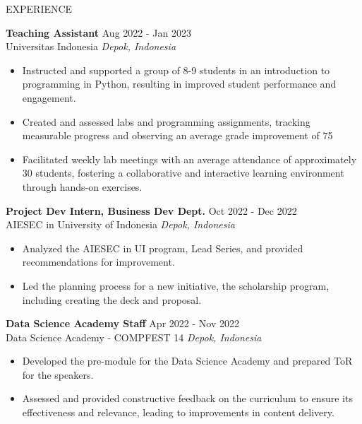 \documentclass{resume} %
\begin{document}
\begin{rSection}{EXPERIENCE}

\textbf{Teaching Assistant} \hfill Aug 2022 - Jan 2023 \\
Universitas Indonesia \hfill \textit{Depok, Indonesia}
\vspace{-0.75em}
\begin{itemize}
\itemsep -7pt {}
\item Instructed and supported a group of 8-9 students in an introduction to programming in Python, resulting in improved student performance and engagement.
\item Created and assessed labs and programming assignments, tracking measurable progress and observing an average grade improvement of 75%
\item Facilitated weekly lab meetings with an average attendance of approximately 30 students, fostering a collaborative and interactive learning environment through hands-on exercises.
 \end{itemize}
 \vspace{-0.25em}

\textbf{Project Dev Intern, Business Dev Dept.} \hfill Oct 2022 - Dec 2022 \\
AIESEC in University of Indonesia \hfill \textit{Depok, Indonesia}
\vspace{-0.75em}
\begin{itemize}
\itemsep -7pt {}
\item Analyzed the AIESEC in UI program, Lead Series, and provided recommendations for improvement.
\item Led the planning process for a new initiative, the scholarship program, including creating the deck and proposal.
 \end{itemize}
 \vspace{-0.25em}

\textbf{Data Science Academy Staff} \hfill Apr 2022 - Nov 2022 \\
Data Science Academy - COMPFEST 14 \hfill \textit{Depok, Indonesia}
\vspace{-0.75em}
\begin{itemize}
\itemsep -7pt {}
\item Developed the pre-module for the Data Science Academy and prepared ToR for the speakers.
\item Assessed and provided constructive feedback on the curriculum to ensure its effectiveness and relevance, leading to improvements in content delivery.
 \end{itemize}
 \vspace{-0.25em}


\end{rSection} 
\end{document}
